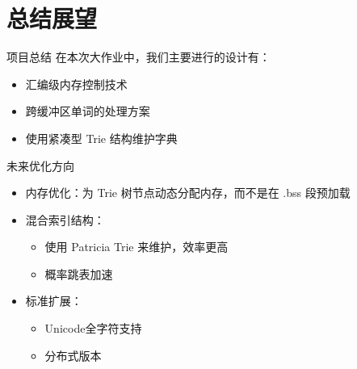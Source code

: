 \documentclass{beamer}
\begin{document}
\section{总结展望}
\begin{frame}{项目总结}
在本次大作业中，我们主要进行的设计有：
\begin{itemize}
\item 汇编级内存控制技术
\item 跨缓冲区单词的处理方案
\item 使用紧凑型 Trie 结构维护字典
\end{itemize}
\end{frame}

\begin{frame}{未来优化方向}
\begin{itemize}
\item 内存优化：为 Trie 树节点动态分配内存，而不是在 .bss 段预加载
\item 混合索引结构：
\begin{itemize}
\item 使用 Patricia Trie 来维护，效率更高
\item 概率跳表加速
\end{itemize}
\item 标准扩展：
\begin{itemize}
\item Unicode全字符支持
\item 分布式版本
\end{itemize}
\end{itemize}
\end{frame}
\end{document}
